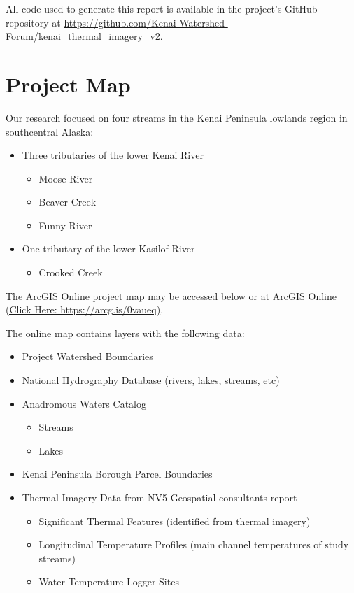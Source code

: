 \documentclass[
  letterpaper,
  DIV=11,
  numbers=noendperiod]{scrreprt}
\providecommand{\tightlist}{%
  \setlength{\itemsep}{0pt}\setlength{\parskip}{0pt}}\usepackage{longtable,booktabs,array}
\begin{document}
All code used to generate this report is available in the project's
GitHub repository at
\url{https://github.com/Kenai-Watershed-Forum/kenai_thermal_imagery_v2}.


\hypertarget{project-map}{%
\chapter{Project Map}\label{project-map}}

Our research focused on four streams in the Kenai Peninsula lowlands
region in southcentral Alaska:

\begin{itemize}
\item
  Three tributaries of the lower Kenai River

  \begin{itemize}
  \item
    Moose River
  \item
    Beaver Creek
  \item
    Funny River
  \end{itemize}
\item
  One tributary of the lower Kasilof River

  \begin{itemize}
  \tightlist
  \item
    Crooked Creek
  \end{itemize}
\end{itemize}

The ArcGIS Online project map may be accessed below or at
\href{https://arcg.is/0vaueq}{ArcGIS Online (Click Here:
https://arcg.is/0vaueq)}.

The online map contains layers with the following data:

\begin{itemize}
\item
  Project Watershed Boundaries
\item
  National Hydrography Database (rivers, lakes, streams, etc)
\item
  Anadromous Waters Catalog

  \begin{itemize}
  \item
    Streams
  \item
    Lakes
  \end{itemize}
\item
  Kenai Peninsula Borough Parcel Boundaries
\item
  Thermal Imagery Data from NV5 Geospatial consultants report

  \begin{itemize}
  \item
    Significant Thermal Features (identified from thermal imagery)
  \item
    Longitudinal Temperature Profiles (main channel temperatures of
    study streams)
  \item
    Water Temperature Logger Sites
  \end{itemize}
\end{itemize}
\end{document}
